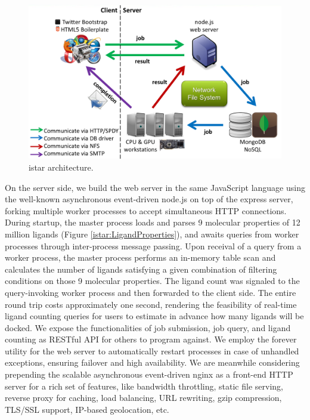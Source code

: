 \begin{figure}
\centering
\includegraphics[width=\linewidth]{istar/Architecture.png}
\caption{istar architecture.}
\label{istar:Architecture}
\end{figure}

On the server side, we build the web server in the same JavaScript language using the well-known asynchronous event-driven node.js on top of the express server, forking multiple worker processes to accept simultaneous HTTP connections. During startup, the master process loads and parses 9 molecular properties of 12 million ligands (Figure \ref{istar:LigandProperties}), and awaits queries from worker processes through inter-process message passing. Upon receival of a query from a worker process, the master process performs an in-memory table scan and calculates the number of ligands satisfying a given combination of filtering conditions on those 9 molecular properties. The ligand count was signaled to the query-invoking worker process and then forwarded to the client side. The entire round trip costs approximately one second, rendering the feasibility of real-time ligand counting queries for users to estimate in advance how many ligands will be docked. We expose the functionalities of job submission, job query, and ligand counting as RESTful API for others to program against. We employ the forever utility for the web server to automatically restart processes in case of unhandled exceptions, ensuring failover and high availability. We are meanwhile considering prepending the scalable asynchronous event-driven nginx as a front-end HTTP server for a rich set of features, like bandwidth throttling, static file serving, reverse proxy for caching, load balancing, URL rewriting, gzip compression, TLS/SSL support, IP-based geolocation, etc.

